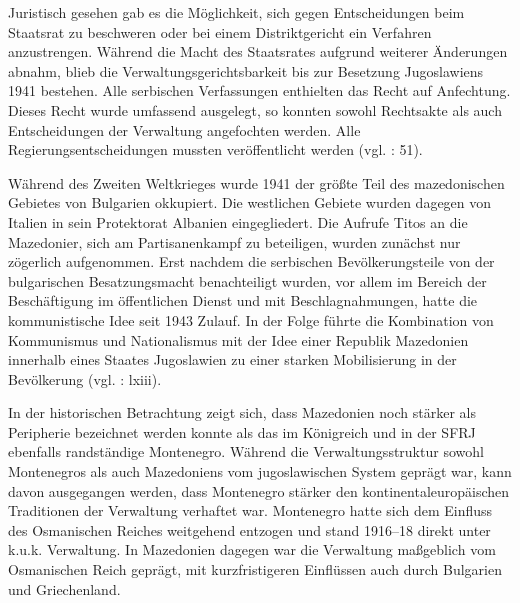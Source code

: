 Juristisch gesehen gab es die Möglichkeit, sich gegen Entscheidungen beim Staatsrat zu beschweren oder bei einem Distriktgericht ein Verfahren anzustrengen. Während die Macht des Staatsrates aufgrund weiterer Änderungen abnahm, blieb die Verwaltungsgerichtsbarkeit bis zur Besetzung Jugoslawiens 1941 bestehen. Alle serbischen Verfassungen enthielten das Recht auf Anfechtung. Dieses Recht wurde umfassend ausgelegt, so konnten sowohl Rechtsakte als auch Entscheidungen der Verwaltung angefochten werden. Alle Regierungsentscheidungen mussten veröffentlicht werden (vgl. \cite{sevic} : 51).\par

Während des Zweiten Weltkrieges wurde 1941 der größte Teil des mazedonischen Gebietes von Bulgarien okkupiert. Die westlichen Gebiete wurden dagegen von Italien in sein Protektorat Albanien eingegliedert. Die Aufrufe Titos an die Mazedonier, sich am Partisanenkampf zu beteiligen, wurden zunächst nur zögerlich aufgenommen. Erst nachdem die serbischen Bevölkerungsteile von der bulgarischen Besatzungsmacht benachteiligt wurden, vor allem im Bereich der Beschäftigung im öffentlichen Dienst und mit Beschlagnahmungen, hatte die kommunistische Idee seit 1943 Zulauf. In der Folge führte die Kombination von Kommunismus und Nationalismus mit der Idee einer Republik Mazedonien innerhalb eines Staates Jugoslawien zu einer starken Mobilisierung in der Bevölkerung (vgl. \cite{bech09} : lxiii).\par

In der historischen Betrachtung zeigt sich, dass Mazedonien noch stärker als Peripherie bezeichnet werden konnte als das im Königreich und in der SFRJ ebenfalls randständige Montenegro. Während die Verwaltungsstruktur sowohl Montenegros als auch Mazedoniens vom jugoslawischen System geprägt war, kann davon ausgegangen werden, dass Montenegro stärker den kontinentaleuropäischen Traditionen der Verwaltung verhaftet war. Montenegro hatte sich dem Einfluss des Osmanischen Reiches weitgehend entzogen und stand 1916–18 direkt unter k.u.k. Verwaltung. In Mazedonien dagegen war die Verwaltung maßgeblich vom Osmanischen Reich geprägt, mit kurzfristigeren Einflüssen auch durch Bulgarien und Griechenland.\par

